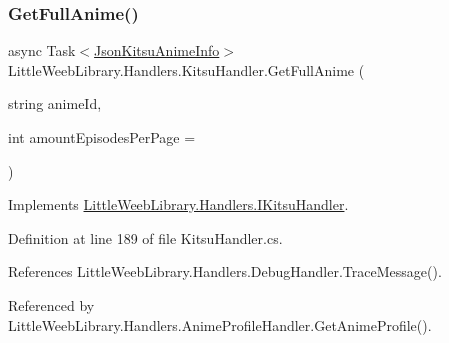 \mbox{\label{class_little_weeb_library_1_1_handlers_1_1_kitsu_handler_a5f655ed8b3e26f6d6767e090eea9e3bb}} 
\subsubsection{\texorpdfstring{Get\+Full\+Anime()}{GetFullAnime()}}
{\footnotesize\ttfamily async Task$<$\mbox{\hyperlink{class_little_weeb_library_1_1_models_1_1_json_kitsu_anime_info}{Json\+Kitsu\+Anime\+Info}}$>$ Little\+Weeb\+Library.\+Handlers.\+Kitsu\+Handler.\+Get\+Full\+Anime (\begin{DoxyParamCaption}\item[{string}]{anime\+Id,  }\item[{int}]{amount\+Episodes\+Per\+Page = {} }\end{DoxyParamCaption})}



Implements \mbox{\hyperlink{interface_little_weeb_library_1_1_handlers_1_1_i_kitsu_handler_a6ea08bc341bbaa01174a451acd3d9b08}{Little\+Weeb\+Library.\+Handlers.\+I\+Kitsu\+Handler}}.



Definition at line 189 of file Kitsu\+Handler.\+cs.



References Little\+Weeb\+Library.\+Handlers.\+Debug\+Handler.\+Trace\+Message().



Referenced by Little\+Weeb\+Library.\+Handlers.\+Anime\+Profile\+Handler.\+Get\+Anime\+Profile().


